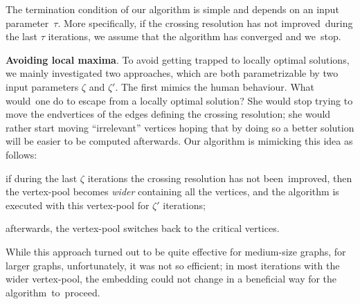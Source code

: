 \documentclass[runningheads]{llncs}
\newcommand{\myparagraph}[1]{\smallskip\noindent\textbf{#1}.}
\begin{document}
The termination condition of our algorithm is simple and depends on an in\-put parameter~$\tau$. More specifically, if the crossing resolution has not improved~during the last $\tau$ iterations, we assume that the algorithm has converged and we~stop.

\myparagraph{Avoiding local maxima}
%
To avoid getting trapped to locally optimal solutions, we mainly investigated two approaches, which are both  parametrizable by two input parameters $\zeta$ and $\zeta'$. The first mimics the human behaviour. What would~one do to escape from a locally optimal solution? She would stop trying to move the endvertices of the edges defining the crossing resolution; she would rather start moving ``irrelevant'' vertices hoping that
by doing so a better solution will be easier to be computed afterwards. Our algorithm is mimicking this idea as follows:
%
\begin{inparaenum}[(i)]
\item if during the last $\zeta$ iterations the crossing resolution has not been~improved, then the vertex-pool becomes \emph{wider} containing all the vertices, and the algorithm is executed with this vertex-pool for $\zeta'$ iterations;
\item afterwards, the vertex-pool switches back to the critical vertices.
\end{inparaenum}
%
While this approach turned out to be quite effective for medium-size graphs, for larger graphs, unfortunately, it was not so efficient; in most iterations with the wider vertex-pool, the embedding could not change in a beneficial way for the algorithm~to~proceed.

\end{document}
